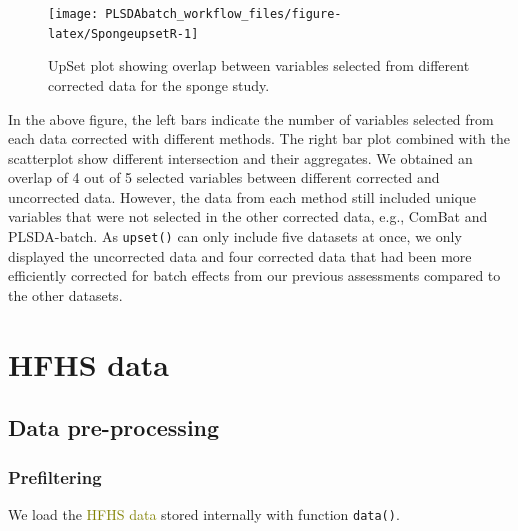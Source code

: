 \documentclass[
]{book}
\newenvironment{Shaded}{\begin{snugshade}}{\end{snugshade}}
\newcommand{\FunctionTok}[1]{\textcolor[rgb]{0.00,0.00,0.00}{#1}}
\newcommand{\NormalTok}[1]{#1}
\newcommand{\OtherTok}[1]{\textcolor[rgb]{0.56,0.35,0.01}{#1}}
\newcommand{\SpecialCharTok}[1]{\textcolor[rgb]{0.00,0.00,0.00}{#1}}
\newcommand{\StringTok}[1]{\textcolor[rgb]{0.31,0.60,0.02}{#1}}
\begin{document}
\begin{figure}

{\centering \texttt{[image: PLSDAbatch\_workflow\_files/figure-latex/SpongeupsetR-1]} 

}

\caption{UpSet plot showing overlap between variables selected from different corrected data for the sponge study.}\label{fig:SpongeupsetR}
\end{figure}

In the above figure, the left bars indicate the number of variables selected from each data corrected with different methods. The right bar plot combined with the scatterplot show different intersection and their aggregates. We obtained an overlap of 4 out of 5 selected variables between different corrected and uncorrected data. However, the data from each method still included unique variables that were not selected in the other corrected data, e.g., ComBat and PLSDA-batch. As \texttt{upset()} can only include five datasets at once, we only displayed the uncorrected data and four corrected data that had been more efficiently corrected for batch effects from our previous assessments compared to the other datasets.

\hypertarget{hfhs-data}{%
\section{HFHS data}\label{hfhs-data}}

\hypertarget{data-pre-processing-2}{%
\subsection{Data pre-processing}\label{data-pre-processing-2}}

\hypertarget{prefiltering}{%
\subsubsection{Prefiltering}\label{prefiltering}}

We load the \textcolor{olive}{HFHS data} stored internally with function \texttt{data()}.

\begin{Shaded}
\end{Shaded}
\end{document}
